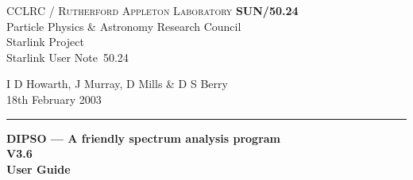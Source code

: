 \documentclass[twoside,11pt]{article}
\newcommand{\stardoccategory}  {Starlink User Note}
\newcommand{\stardocinitials}  {SUN}
\newcommand{\stardocnumber} {50.24}
\newcommand{\stardocauthors} {I D Howarth, J Murray, D Mills \& D S Berry}
\newcommand{\stardocdate} {18th February 2003}
\newcommand{\stardoctitle} {DIPSO --- A friendly spectrum analysis program}
\newcommand{\stardocversion}   {V3.6}
\newcommand{\stardocmanual}    {User Guide}
\newcommand{\stardocname}{\stardocinitials /\stardocnumber}
\newenvironment{latexonly}{}{}
\renewcommand{\_}{\texttt{\symbol{95}}}
\begin{document}
\thispagestyle{empty}

\begin{latexonly}
   CCLRC / \textsc{Rutherford Appleton Laboratory} \hfill \textbf{\stardocname}\\
   {\large Particle Physics \& Astronomy Research Council}\\
   {\large Starlink Project\\}
   {\large \stardoccategory\ \stardocnumber}
   \begin{flushright}
   \stardocauthors\\
   \stardocdate
   \end{flushright}
   \vspace{-4mm}
   \rule{\textwidth}{0.5mm}
   \vspace{5mm}
   \begin{center}
   {\Huge\textbf{\stardoctitle \\ [2.5ex]}}
   {\LARGE\textbf{\stardocversion \\ [4ex]}}
   {\Huge\textbf{\stardocmanual}}
   \end{center}
   \vspace{5mm}


\end{latexonly}
\end{document}
